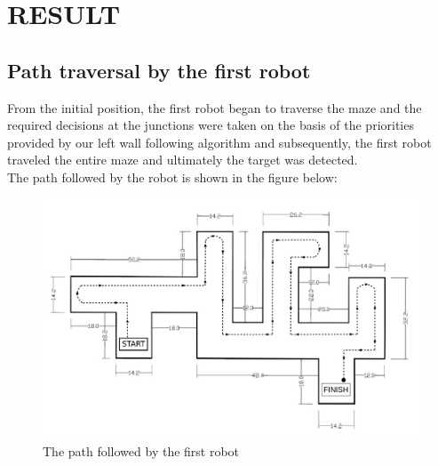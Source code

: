 \section{RESULT}
\subsection{Path traversal by the first robot}
From the initial position, the first robot began to traverse the maze and the required decisions at the junctions were taken on the basis of the priorities  provided by our left wall following algorithm and subsequently, the first robot traveled the entire maze and ultimately the target was detected.\\
The path followed by the robot is shown in the figure below: 
\begin{figure}[h]
\center
\includegraphics[scale=0.3]{mazetraverse_newnew.jpg} 
\caption{The path followed by the first robot}
\end{figure}
